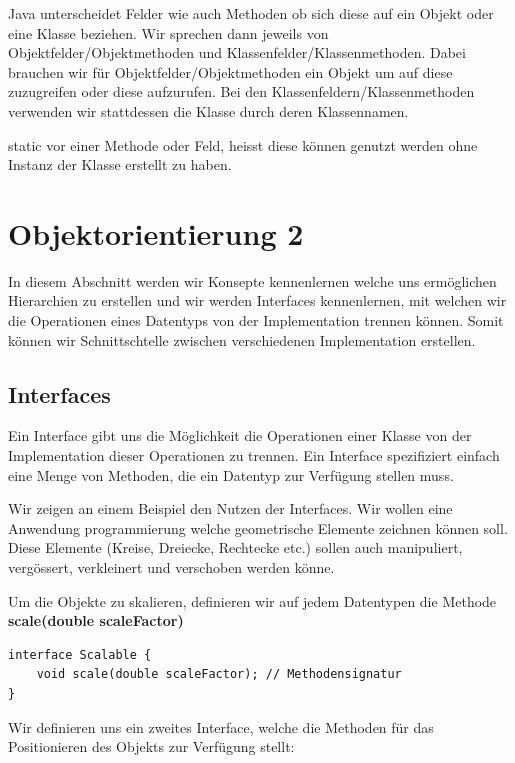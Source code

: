 \documentclass[12pt]{article}
\begin{document}
    Java unterscheidet Felder wie auch Methoden ob sich diese auf ein Objekt oder eine Klasse beziehen. 
    Wir sprechen dann jeweils von Objektfelder/Objektmethoden und Klassenfelder/Klassenmethoden. 
    Dabei brauchen wir für Objektfelder/Objektmethoden ein Objekt um auf diese zuzugreifen oder diese aufzurufen. 
    Bei den Klassenfeldern/Klassenmethoden verwenden wir stattdessen die Klasse durch deren Klassennamen.

    static vor einer Methode oder Feld, heisst diese können genutzt werden ohne Instanz der Klasse erstellt zu haben. 

\section*{Objektorientierung 2}

In diesem Abschnitt werden wir Konsepte kennenlernen welche uns ermöglichen Hierarchien zu erstellen und wir werden Interfaces kennenlernen,
mit welchen wir die Operationen eines Datentyps von der Implementation trennen können. Somit können wir Schnittschtelle zwischen verschiedenen Implementation 
erstellen. 

    \subsection*{Interfaces}

    Ein Interface gibt uns die Möglichkeit die Operationen einer Klasse von der Implementation dieser Operationen zu trennen. 
    Ein Interface spezifiziert einfach eine Menge von Methoden, die ein Datentyp zur Verfügung stellen muss.

    Wir zeigen an einem Beispiel den Nutzen der Interfaces. 
    Wir wollen eine Anwendung programmierung welche geometrische Elemente zeichnen können soll. Diese Elemente (Kreise, Dreiecke, Rechtecke etc.) 
    sollen auch manipuliert, vergössert, verkleinert und verschoben werden könne. 


    Um die Objekte zu skalieren, definieren wir auf jedem Datentypen die Methode \textbf{scale(double scaleFactor)} 

    \begin{lstlisting}[caption=Scalable]
interface Scalable {
    void scale(double scaleFactor); // Methodensignatur 
}
    \end{lstlisting}

    Wir definieren uns ein zweites Interface, welche die Methoden für das Positionieren des Objekts zur Verfügung stellt:
\end{document}

